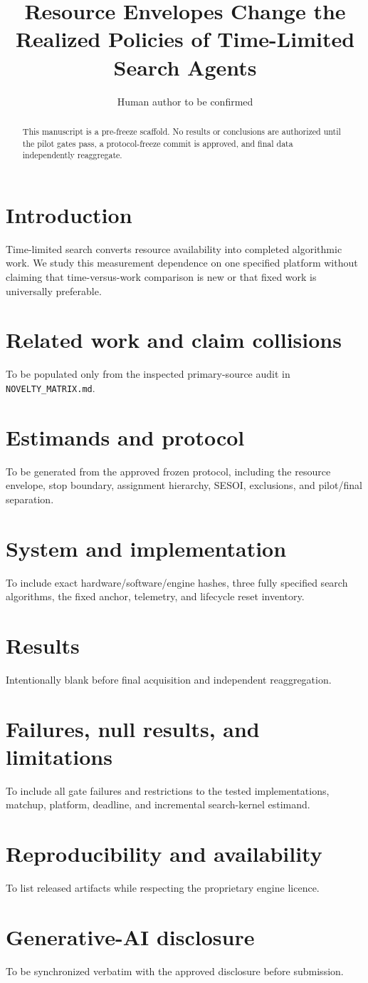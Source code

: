 \documentclass[11pt]{article}
\title{Resource Envelopes Change the Realized Policies of Time-Limited Search Agents}
\author{Human author to be confirmed}
\date{}
\begin{document}
\maketitle

\begin{abstract}
This manuscript is a pre-freeze scaffold. No results or conclusions are
authorized until the pilot gates pass, a protocol-freeze commit is approved,
and final data independently reaggregate.
\end{abstract}

\section{Introduction}
Time-limited search converts resource availability into completed algorithmic
work. We study this measurement dependence on one specified platform without
claiming that time-versus-work comparison is new or that fixed work is
universally preferable.

\section{Related work and claim collisions}
To be populated only from the inspected primary-source audit in
\texttt{NOVELTY\_MATRIX.md}.

\section{Estimands and protocol}
To be generated from the approved frozen protocol, including the resource
envelope, stop boundary, assignment hierarchy, SESOI, exclusions, and
pilot/final separation.

\section{System and implementation}
To include exact hardware/software/engine hashes, three fully specified search
algorithms, the fixed anchor, telemetry, and lifecycle reset inventory.

\section{Results}
Intentionally blank before final acquisition and independent reaggregation.

\section{Failures, null results, and limitations}
To include all gate failures and restrictions to the tested implementations,
matchup, platform, deadline, and incremental search-kernel estimand.

\section{Reproducibility and availability}
To list released artifacts while respecting the proprietary engine licence.

\section*{Generative-AI disclosure}
To be synchronized verbatim with the approved disclosure before submission.
\end{document}
